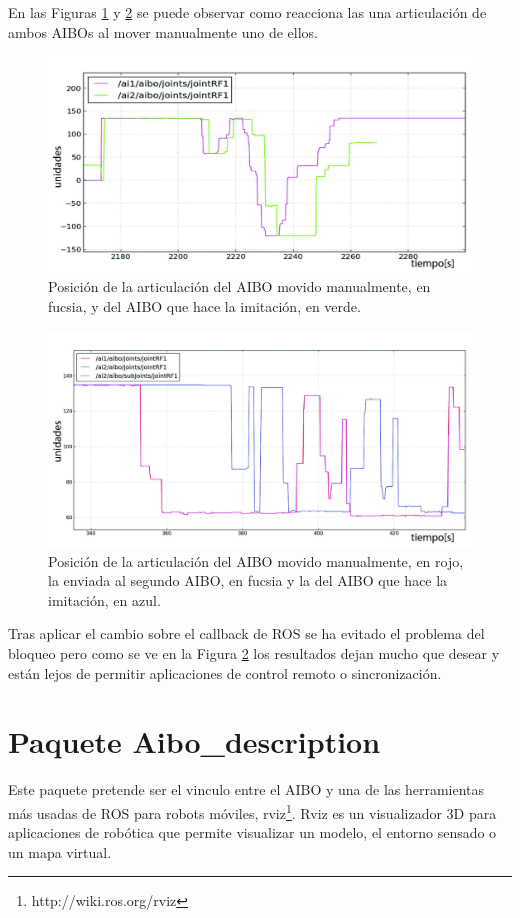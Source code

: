 \documentclass[12pt,a4paper,final,twoside]{book}
\begin{document}
En las Figuras \ref{fig:resumimic} y \ref{fig:resumimic2} se puede observar como reacciona las una articulación de ambos AIBOs al mover manualmente uno de ellos. 
\begin{figure}[H]
	\centering
    \includegraphics[scale=0.2]{images/retmin2.jpg}
	 \caption{Posición de la articulación del AIBO movido manualmente, en fucsia, y del AIBO que hace la imitación, en verde.}
  \label{fig:resumimic}
\end{figure}
\begin{figure}[H]
	\centering
    \includegraphics[scale=0.2]{images/malo5hz.jpg}
	 \caption{Posición de la articulación del AIBO movido manualmente, en rojo, la enviada al segundo AIBO, en fucsia y la del AIBO que hace la imitación, en azul.}
  \label{fig:resumimic2}
\end{figure}


Tras aplicar el cambio sobre el callback de ROS se ha evitado el problema del bloqueo pero como se ve en la Figura \ref{fig:resumimic2} los resultados dejan mucho que desear y están lejos de permitir aplicaciones de control remoto o sincronización. 

\section{Paquete Aibo{\_}description }
Este paquete pretende ser el vinculo entre el AIBO y una de las herramientas más usadas de ROS para robots móviles, rviz\footnote{http://wiki.ros.org/rviz}. Rviz es un visualizador 3D para aplicaciones de robótica que permite visualizar un modelo, el entorno sensado o un mapa virtual. 
\end{document}

